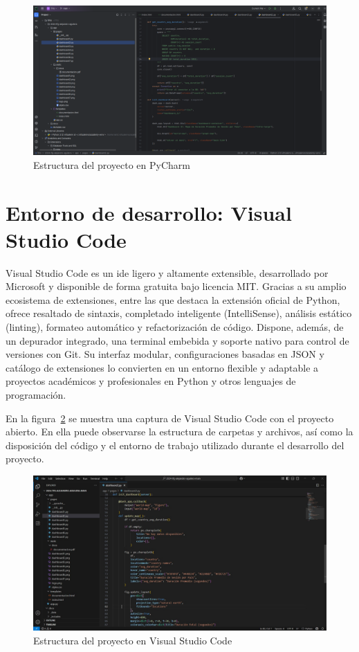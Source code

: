 \documentclass[a4paper, 12pt]{book}
\begin{document}
\begin{figure}[h!]
    \centering
    \includegraphics[width=1.1\textwidth]{img/pycharm.png}
    \caption{Estructura del proyecto en PyCharm}
    \label{fig:pycharm_project}
\end{figure}


\section{Entorno de desarrollo: Visual Studio Code}
\label{sec:entorno_de_desarrollo_vscode}

Visual Studio Code es un \gls{ide} ligero y altamente extensible, desarrollado por Microsoft y disponible de forma gratuita bajo licencia MIT. Gracias a su amplio ecosistema de extensiones, entre las que destaca la extensión oficial de Python, ofrece resaltado de sintaxis, completado inteligente (IntelliSense), análisis estático (linting), formateo automático y refactorización de código. Dispone, además, de un depurador integrado, una terminal embebida y soporte nativo para control de versiones con Git. Su interfaz modular, configuraciones basadas en JSON y catálogo de extensiones lo convierten en un entorno flexible y adaptable a proyectos académicos y profesionales en Python y otros lenguajes de programación.

En la figura~\ref{fig:vscode_project} se muestra una captura de Visual Studio Code con el proyecto abierto. En ella puede observarse la estructura de carpetas y archivos, así como la disposición del código y el entorno de trabajo utilizado durante el desarrollo del proyecto.

\begin{figure}[h!]
    \centering
    \includegraphics[width=1.1\textwidth]{img/vstudio.jpeg}
    \caption{Estructura del proyecto en Visual Studio Code}
    \label{fig:vscode_project}
\end{figure}
  
\end{document}
